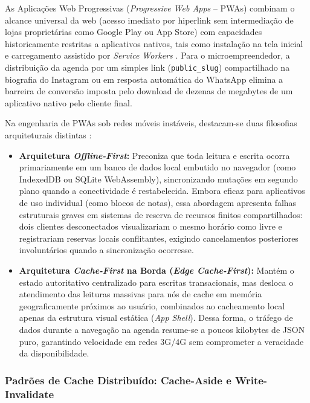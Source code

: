 \documentclass[12pt,a4paper]{article}
\begin{document}
As Aplicações Web Progressivas (\textit{Progressive Web Apps} -- PWAs) combinam o alcance universal da web (acesso imediato por hiperlink sem intermediação de lojas proprietárias como Google Play ou App Store) com capacidades historicamente restritas a aplicativos nativos, tais como instalação na tela inicial e carregamento assistido por \textit{Service Workers} \cite{pwa_optimal_strategies}. Para o microempreendedor, a distribuição da agenda por um simples link (\texttt{public\_slug}) compartilhado na biografia do Instagram ou em resposta automática do WhatsApp elimina a barreira de conversão imposta pelo download de dezenas de megabytes de um aplicativo nativo pelo cliente final.

Na engenharia de PWAs sob redes móveis instáveis, destacam-se duas filosofias arquiteturais distintas \cite{kleppmann2017}:
\begin{itemize}
    \item \textbf{Arquitetura \textit{Offline-First}:} Preconiza que toda leitura e escrita ocorra primariamente em um banco de dados local embutido no navegador (como IndexedDB ou SQLite WebAssembly), sincronizando mutações em segundo plano quando a conectividade é restabelecida. Embora eficaz para aplicativos de uso individual (como blocos de notas), essa abordagem apresenta falhas estruturais graves em sistemas de reserva de recursos finitos compartilhados: dois clientes desconectados visualizariam o mesmo horário como livre e registrariam reservas locais conflitantes, exigindo cancelamentos posteriores involuntários quando a sincronização ocorresse.
    \item \textbf{Arquitetura \textit{Cache-First} na Borda (\textit{Edge Cache-First}):} Mantém o estado autoritativo centralizado para escritas transacionais, mas desloca o atendimento das leituras massivas para nós de cache em memória geograficamente próximos ao usuário, combinados ao cacheamento local apenas da estrutura visual estática (\textit{App Shell}). Dessa forma, o tráfego de dados durante a navegação na agenda resume-se a poucos kilobytes de JSON puro, garantindo velocidade em redes 3G/4G sem comprometer a veracidade da disponibilidade.
\end{itemize}

\subsubsection{Padrões de Cache Distribuído: Cache-Aside e Write-Invalidate}
\label{subsubsec:padroes_cache}
\end{document}
